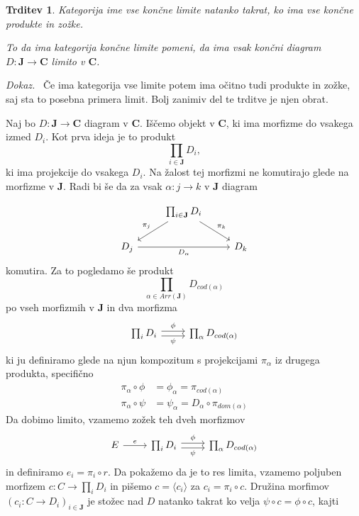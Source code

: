 \documentclass[12pt,a4paper]{book}
\theoremstyle{definition}
\theoremstyle{plain}
\newtheorem{trditev}[definicija]{Trditev}
\newenvironment{dokaz}{\emph{Dokaz.}\ }{\hspace{\fill}{$\Box$}}
\theoremstyle{definition}
\theoremstyle{remark}
\newcommand{\cat}[1]{\textbf{#1}}
\begin{document}
\begin{trditev} \label{konstrukcija limit}
Kategorija ime vse \textit{končne limite} natanko takrat, ko ima vse končne produkte in zožke.

To da ima kategorija končne limite pomeni, da ima vsak končni diagram $D : \cat{J} \to \cat{C}$ limito v $\cat{C}$.

\end{trditev}
\begin{dokaz}
Če ima kategorija vse limite potem ima očitno tudi produkte in zožke, saj sta to posebna primera limit. Bolj zanimiv del te trditve je njen obrat.

Naj bo $D : \cat{J} \to \cat{C}$ diagram v $\cat{C}$. Iščemo objekt v $\cat{C}$, ki ima morfizme do vsakega izmed $D_i$. Kot prva ideja je to produkt 
$$\prod_{i \in \cat{J}}D_i,$$
ki ima projekcije do vsakega $D_i$. Na žalost tej morfizmi ne komutirajo glede na morfizme v $\cat{J}$. Radi bi še da za vsak $\alpha : j \to k$ v $\cat{J}$ diagram

$$ \begin{tikzcd}
& \prod_{i \in \cat{J}}D_i \ar[dl, "\pi_j"'] \ar[dr, "\pi_k"] & \\
D_j \ar[rr, "D_\alpha"'] && D_k
\end{tikzcd} $$
komutira. Za to pogledamo še produkt 
$$ \prod_{\alpha \in Arr(\cat{J})} D_{cod(\alpha)} $$
po vseh morfizmih v $\cat{J}$ in dva morfizma
$$ \begin{tikzcd}[sep=normal]
\prod_{i }D_i \ar[r, shift left, "\phi"] \ar[r, shift right, "\psi"'] & \prod_{\alpha } D_{cod(\alpha)}
\end{tikzcd} $$
ki ju definiramo glede na njun kompozitum s projekcijami $\pi_\alpha$ iz drugega produkta, specifično
\begin{align*}
\pi_\alpha \circ \phi &= \phi_\alpha = \pi_{cod(\alpha)} \\
\pi_\alpha \circ \psi &= \psi_\alpha = D_\alpha \circ \pi_{dom(\alpha)}
\end{align*}
Da dobimo limito, vzamemo zožek teh dveh morfizmov
$$ \begin{tikzcd}[sep=normal]
E \ar[r, "e"] & \prod_{i }D_i \ar[r, shift left, "\phi"] \ar[r, shift right, "\psi"'] & \prod_{\alpha } D_{cod(\alpha)}
\end{tikzcd} $$
in definiramo $e_i = \pi_i \circ r$. Da pokažemo da je to res limita, vzamemo poljuben morfizem $c : C \to \prod_i D_i$ in pišemo $c = \langle c_i \rangle$ za $c_i = \pi_i \circ c$. Družina morfimov $(c_i : C \to D_i)_{i \in \cat{J}}$ je stožec nad $D$ natanko takrat ko velja $\psi \circ c = \phi \circ c$, kajti


\end{dokaz}
\end{document}
